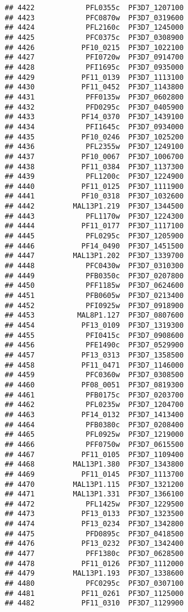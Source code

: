 \documentclass[12pt, a4paper]{article}\usepackage[]{graphicx}\usepackage[]{color}
\makeatletter
\newenvironment{kframe}{%
 \def\at@end@of@kframe{}%
 \ifinner\ifhmode%
  \def\at@end@of@kframe{\end{minipage}}%
  \begin{minipage}{\columnwidth}%
 \fi\fi%
 \def\FrameCommand##1{\hskip\@totalleftmargin \hskip-\fboxsep
 \colorbox{shadecolor}{##1}\hskip-\fboxsep
     \hskip-\linewidth \hskip-\@totalleftmargin \hskip\columnwidth}%
 \MakeFramed {\advance\hsize-\width
   \@totalleftmargin\z@ \linewidth\hsize
   \@setminipage}}%
 {\par\unskip\endMakeFramed%
 \at@end@of@kframe}
\newenvironment{knitrout}{}{} %
\makeatother
\begin{document}
\begin{knitrout}
\begin{kframe}
\begin{verbatim}
## 4422            PFL0355c  PF3D7_1207100
## 4423            PFC0870w  PF3D7_0319600
## 4424            PFL2160c  PF3D7_1245000
## 4425            PFC0375c  PF3D7_0308900
## 4426           PF10_0215  PF3D7_1022100
## 4427            PFI0720w  PF3D7_0914700
## 4428            PFI1695c  PF3D7_0935000
## 4429           PF11_0139  PF3D7_1113100
## 4430           PF11_0452  PF3D7_1143800
## 4431            PFF0135w  PF3D7_0602800
## 4432            PFD0295c  PF3D7_0405900
## 4433           PF14_0370  PF3D7_1439100
## 4434            PFI1645c  PF3D7_0934000
## 4435           PF10_0246  PF3D7_1025200
## 4436            PFL2355w  PF3D7_1249100
## 4437           PF10_0067  PF3D7_1006700
## 4438           PF11_0384  PF3D7_1137300
## 4439            PFL1200c  PF3D7_1224900
## 4440           PF11_0125  PF3D7_1111900
## 4441           PF10_0318  PF3D7_1032600
## 4442         MAL13P1.219  PF3D7_1344500
## 4443            PFL1170w  PF3D7_1224300
## 4444           PF11_0177  PF3D7_1117100
## 4445            PFL0295c  PF3D7_1205900
## 4446           PF14_0490  PF3D7_1451500
## 4447         MAL13P1.202  PF3D7_1339700
## 4448            PFC0430w  PF3D7_0310300
## 4449            PFB0350c  PF3D7_0207800
## 4450            PFF1185w  PF3D7_0624600
## 4451            PFB0605w  PF3D7_0213400
## 4452            PFI0925w  PF3D7_0918900
## 4453          MAL8P1.127  PF3D7_0807600
## 4454           PF13_0109  PF3D7_1319300
## 4455            PFI0415c  PF3D7_0908600
## 4456            PFE1490c  PF3D7_0529900
## 4457           PF13_0313  PF3D7_1358500
## 4458           PF11_0471  PF3D7_1146000
## 4459            PFC0360w  PF3D7_0308500
## 4460           PF08_0051  PF3D7_0819300
## 4461            PFB0175c  PF3D7_0203700
## 4462            PFL0235w  PF3D7_1204700
## 4463           PF14_0132  PF3D7_1413400
## 4464            PFB0380c  PF3D7_0208400
## 4465            PFL0925w  PF3D7_1219000
## 4466            PFF0750w  PF3D7_0615500
## 4467           PF11_0105  PF3D7_1109400
## 4468         MAL13P1.380  PF3D7_1343800
## 4469           PF11_0145  PF3D7_1113700
## 4470         MAL13P1.115  PF3D7_1321200
## 4471         MAL13P1.331  PF3D7_1366100
## 4472            PFL1425w  PF3D7_1229500
## 4473           PF13_0133  PF3D7_1323500
## 4474           PF13_0234  PF3D7_1342800
## 4475            PFD0895c  PF3D7_0418500
## 4476           PF13_0232  PF3D7_1342400
## 4477            PFF1380c  PF3D7_0628500
## 4478           PF11_0126  PF3D7_1112000
## 4479         MAL13P1.193  PF3D7_1338600
## 4480            PFC0295c  PF3D7_0307100
## 4481           PF11_0261  PF3D7_1125000
## 4482           PF11_0310  PF3D7_1129900

\end{verbatim}
\end{kframe}
\end{knitrout}
\end{document}
